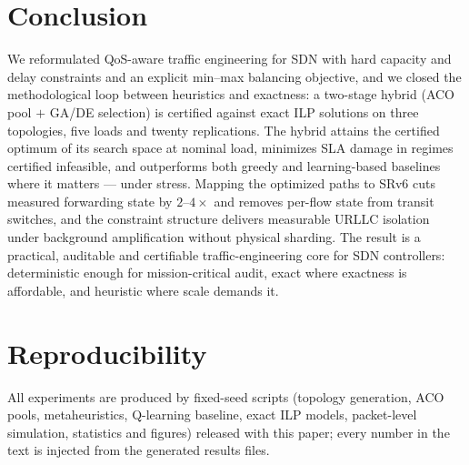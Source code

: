 \documentclass[journal]{IEEEtran}
\begin{document}
\section{Conclusion}
\label{sec:conc}
We reformulated QoS-aware traffic engineering for SDN with hard capacity and
delay constraints and an explicit min--max balancing objective, and we closed
the methodological loop between heuristics and exactness: a two-stage hybrid
(ACO pool $+$ GA/DE selection) is certified against exact ILP solutions on
three topologies, five loads and twenty replications. The hybrid attains the
certified optimum of its search space at nominal load, minimizes SLA damage
in regimes certified infeasible, and outperforms both greedy and
learning-based baselines where it matters --- under stress. Mapping the
optimized paths to SRv6 cuts measured forwarding state by $2$--$4\times$ and
removes per-flow state from transit switches, and the constraint structure
delivers measurable URLLC isolation under background amplification without
physical sharding. The result is a practical, auditable and certifiable
traffic-engineering core for SDN controllers: deterministic enough for
mission-critical audit, exact where exactness is affordable, and heuristic
where scale demands it.

\section*{Reproducibility}
All experiments are produced by fixed-seed scripts (topology generation,
ACO pools, metaheuristics, Q-learning baseline, exact ILP models,
packet-level simulation, statistics and figures) released with this paper;
every number in the text is injected from the generated results files.
\end{document}
